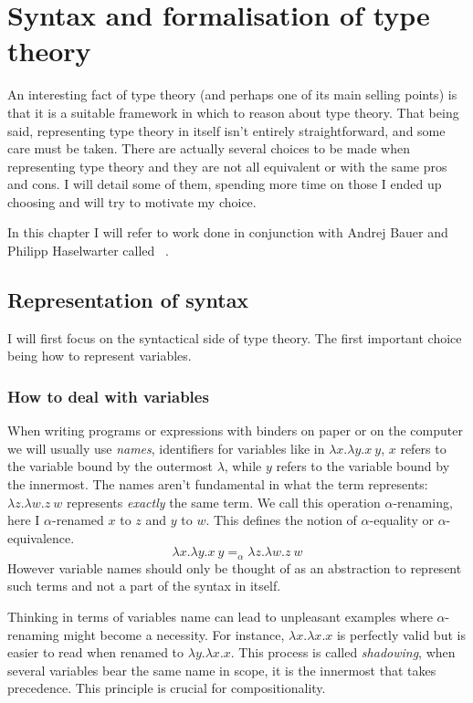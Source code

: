 \chapter{Syntax and formalisation of type theory}

An interesting fact of type theory (and perhaps one of its main selling points)
is that it is a suitable framework in which to reason about type theory.
That being said, representing type theory in itself isn't entirely
straightforward, and some care must be taken. There are actually several choices
to be made when representing type theory and they are not all equivalent or with
the same pros and cons.
I will detail some of them, spending more time on those I ended up choosing
and will try to motivate my choice.

In this chapter I will refer to work done in conjunction with Andrej Bauer and
Philipp Haselwarter called \ftt~.

\section{Representation of syntax}

I will first focus on the syntactical side of type theory.
The first important choice being how to represent variables.

\subsection{How to deal with variables}

When writing programs or expressions with binders on paper or on the computer
we will usually use \emph{names}, identifiers for variables like in
\(\lambda x. \lambda y. x\ y\), \(x\) refers to the variable bound by the
outermost \(\lambda\), while \(y\) refers to the variable bound by the
innermost.
The names aren't fundamental in what the term represents:
\(\lambda z. \lambda w. z\ w\) represents \emph{exactly} the same term.
We call this operation \(\alpha\)-renaming, here I \(\alpha\)-renamed \(x\)
to \(z\) and \(y\) to \(w\). This defines the notion of \(\alpha\)-equality
or \(\alpha\)-equivalence.
\[
  \lambda x. \lambda y. x\ y =_\alpha \lambda z. \lambda w. z\ w
\]
However variable names should only be thought of as an abstraction to represent
such terms and not a part of the syntax in itself.

Thinking in terms of variables name can lead to unpleasant examples where
\(\alpha\)-renaming might become a necessity.
For instance, \(\lambda x. \lambda x. x\) is perfectly valid but is easier to
read when renamed to \(\lambda y. \lambda x. x\). This process is called
\emph{shadowing}, when several variables bear the same name in scope, it is the
innermost that takes precedence. This principle is crucial for compositionality.

